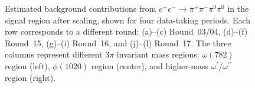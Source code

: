 \begin{figure}[htbp]
\caption{Estimated background contributions from $e^{+}e^{-} \to \pi^{+}\pi^{-}\pi^{0}\pi^{0}$ in the signal region after scaling, shown for four data-taking periods. Each row corresponds to a different round: (a)--(c) Round~03/04, (d)--(f) Round~15, (g)--(i) Round~16, and (j)--(l) Round~17. The three columns represent different $3\pi$ invariant mass regions: $\omega(782)$ region (left), $\phi(1020)$ region (center), and higher-mass $\omega^{\prime}/\omega^{\prime\prime}$ region (right).}
\label{fig:nonisr4pi_all_rounds_regions}
\end{figure}



